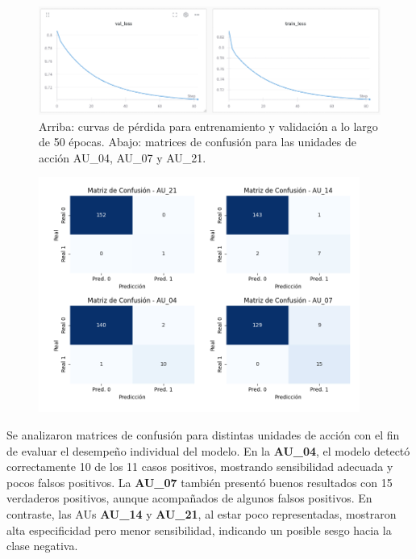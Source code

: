 \documentclass[conference]{IEEEtran}
\begin{document}
\begin{figure}[ht]
    \centering
    \includegraphics[width=\columnwidth]{figs/metrics.png}
    \caption{Arriba: curvas de pérdida para entrenamiento y validación a lo largo de 50 épocas. Abajo: matrices de confusión para las unidades de acción AU\_04, AU\_07 y AU\_21.}
    \label{fig:loss_curves}
\end{figure}
\begin{figure}[ht]
    \centering
    \includegraphics[width=\columnwidth]{figs/AUS_GRID.png}
    \label{fig:loss_curves}
\end{figure}

Se analizaron matrices de confusión para distintas unidades de acción con el fin de evaluar el desempeño individual del modelo. En la \textbf{AU\_04}, el modelo detectó correctamente 10 de los 11 casos positivos, mostrando sensibilidad adecuada y pocos falsos positivos. La \textbf{AU\_07} también presentó buenos resultados con 15 verdaderos positivos, aunque acompañados de algunos falsos positivos. En contraste, las AUs \textbf{AU\_14} y \textbf{AU\_21}, al estar poco representadas, mostraron alta especificidad pero menor sensibilidad, indicando un posible sesgo hacia la clase negativa.
\end{document}

